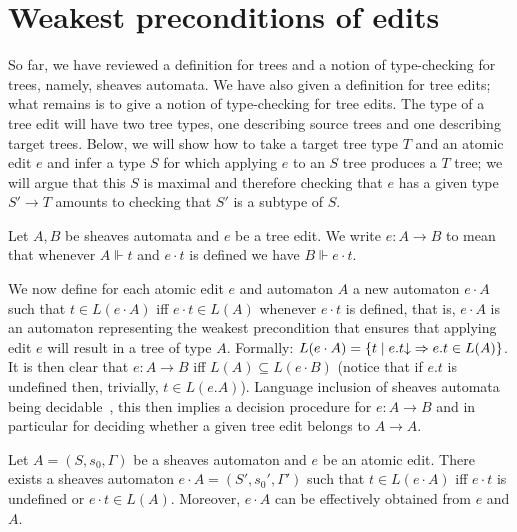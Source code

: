 \section{Weakest preconditions of edits}
So far, we have reviewed a definition for trees and a notion of
type-checking for trees, namely, sheaves automata. We have also given a
definition for tree edits; what remains is to give a notion of type-checking
for tree edits. The type of a tree edit will have two tree types, one
describing source trees and one describing target trees. Below, we will show
how to take a target tree type $T$ and an atomic edit $e$ and infer a type $S$
for which applying $e$ to an $S$ tree produces a $T$ tree; we will argue
that this $S$ is maximal and therefore checking that $e$ has a given type
$S' \to T$ amounts to checking that $S'$ is a subtype of $S$.

Let $A,B$ be sheaves automata and $e$ be a tree edit. We write $e:A\rightarrow
B$ to mean that whenever $A\Vdash t$ and $e\cdot t$ is defined we have $B\Vdash e\cdot t$.

We now define for each atomic edit $e$ and automaton $A$ a new automaton
$e\cdot A$ such that $t\in L(e\cdot A)$ iff $e\cdot t\in L(A)$ whenever
$e\cdot t$ is defined, that is, $e \cdot A$ is an automaton representing the
weakest precondition that ensures that applying edit $e$ will result in a
tree of type $A$. Formally: $L(e\cdot A)=\{t\mid e.t{\downarrow} \Rightarrow
e.t\in L(A)\}$.  It is then clear that $e:A\rightarrow B$ iff $L(A)\subseteq
L(e\cdot B)$ (notice that if $e.t$ is undefined then, trivially, $t\in
L(e.A)$). Language inclusion of sheaves automata being
decidable~\cite{DalzilioS:POPL04}, this then implies a decision procedure
for $e:A\rightarrow B$ and in particular for deciding whether a given tree edit
belongs to $A \to A$.

\begin{theorem}
Let $A=(S,s_0,\Gamma)$ be a sheaves automaton and $e$ be an atomic
edit. There exists a sheaves automaton $e\cdot A = (S',s_0',\Gamma')$ such
that $t\in L(e\cdot A)$ iff $e\cdot t$ is undefined or $e\cdot t\in L(A)$.
Moreover, $e\cdot A$ can be effectively obtained from $e$ and $A$.
\end{theorem}

